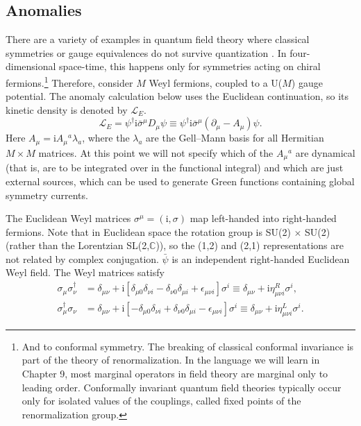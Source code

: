 \subsection{Anomalies}

There are a variety of examples in quantum field theory where classical
symmetries or gauge equivalences do not survive quantization
\cite{banks-ref-100,banks-ref-101,banks-ref-102,banks-ref-103,banks-ref-104,banks-ref-105,banks-ref-106}. In
four-dimensional space-time, this happens only for symmetries acting on chiral
fermions.\footnote[15]{And to conformal symmetry. The breaking of classical
conformal invariance is part of the theory of renormalization. In the language
we will learn in Chapter 9, most marginal operators in field theory are
marginal only to leading order. Conformally invariant quantum field theories
typically occur only for isolated values of the couplings, called fixed points
of the renormalization group.} Therefore, consider $M$ Weyl fermions, coupled
to a U($M$) gauge potential.  The anomaly calculation below uses the Euclidean
continuation, so its kinetic density is denoted by $\mathcal L_E$.
\[
  \mathcal L_E=\psi^\dagger\mathrm{i}\bar\sigma^\mu D_\mu\psi
  \equiv\psi^\dagger\mathrm{i}\bar\sigma^\mu(\partial_\mu-A_\mu)\psi .
\]
Here $A_\mu=\mathrm{i}A_\mu{}^a\lambda_a$, where the $\lambda_a$ are the
Gell--Mann basis for all Hermitian $M\times M$ matrices. At this point we
will not specify which of the $A_\mu{}^a$ are dynamical (that is, are to be
integrated over in the functional integral) and which are just external
sources, which can be used to generate Green functions containing global
symmetry currents.

The Euclidean Weyl matrices $\sigma^\mu=(\mathrm{i},\sigma)$ map left-handed
into right-handed fermions. Note that in Euclidean space the rotation group is
SU(2) $\times$ SU(2) (rather than the Lorentzian SL(2,$\mathbb C$)), so the
(1,2) and (2,1) representations are not related by complex conjugation.
$\bar\psi$ is an independent right-handed Euclidean Weyl field. The Weyl
matrices satisfy
\[
\begin{aligned}
  \sigma_\mu\sigma_\nu^\dagger
    &=\delta_{\mu\nu}+\mathrm{i}
      [\delta_{\mu0}\delta_{\nu i}-\delta_{\nu0}\delta_{\mu i}
       +\epsilon_{\mu\nu i}]\sigma^i
     \equiv\delta_{\mu\nu}+\mathrm{i}\eta^R_{\mu\nu i}\sigma^i,\\
  \sigma_\mu^\dagger\sigma_\nu
    &=\delta_{\mu\nu}+\mathrm{i}
      [-\delta_{\mu0}\delta_{\nu i}+\delta_{\nu0}\delta_{\mu i}
       -\epsilon_{\mu\nu i}]\sigma^i
     \equiv\delta_{\mu\nu}+\mathrm{i}\eta^L_{\mu\nu i}\sigma^i .
\end{aligned}
\]

